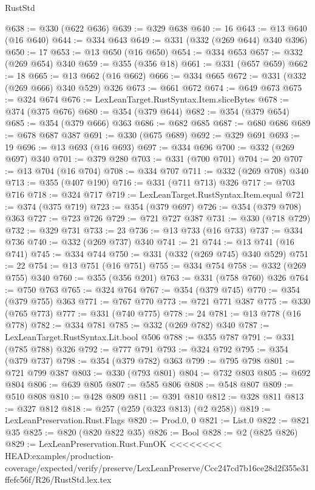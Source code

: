 \begin{lexlean}{RustStd}
\begin{coremodule}
{\begin{coremodule}
{{{{{@638 := @330 (@622 @636)
@639 := @329 @638
@640 := 16
@643 := @13 @640 (@16 @640)
@644 := @334 @643
@649 := @331 (@332 (@269 @644) @340 @396)
@650 := 17
@653 := @13 @650 (@16 @650)
@654 := @334 @653
@657 := @332 (@269 @654) @340
@659 := @355 (@356 @18)
@661 := @331 (@657 @659)
@662 := 18
@665 := @13 @662 (@16 @662)
@666 := @334 @665
@672 := @331 (@332 (@269 @666) @340 @529) @326
@673 := @661 @672
@674 := @649 @673
@675 := @324 @674
@676 := LexLeanTarget.RustSyntax.Item.sliceBytes
@678 := @374 (@375 @676)
@680 := @354 (@379 @644)
@682 := @354 (@379 @654)
@685 := @354 (@379 @666) @363
@686 := @682 @685
@687 := @680 @686
@689 := @678 @687 @387
@691 := @330 (@675 @689)
@692 := @329 @691
@693 := 19
@696 := @13 @693 (@16 @693)
@697 := @334 @696
@700 := @332 (@269 @697) @340
@701 := @379 @280
@703 := @331 (@700 @701)
@704 := 20
@707 := @13 @704 (@16 @704)
@708 := @334 @707
@711 := @332 (@269 @708) @340
@713 := @355 (@407 @190)
@716 := @331 (@711 @713) @326
@717 := @703 @716
@718 := @324 @717
@719 := LexLeanTarget.RustSyntax.Item.equal
@721 := @374 (@375 @719)
@723 := @354 (@379 @697)
@726 := @354 (@379 @708) @363
@727 := @723 @726
@729 := @721 @727 @387
@731 := @330 (@718 @729)
@732 := @329 @731
@733 := 23
@736 := @13 @733 (@16 @733)
@737 := @334 @736
@740 := @332 (@269 @737) @340
@741 := 21
@744 := @13 @741 (@16 @741)
@745 := @334 @744
@750 := @331 (@332 (@269 @745) @340 @529)
@751 := 22
@754 := @13 @751 (@16 @751)
@755 := @334 @754
@758 := @332 (@269 @755) @340
@760 := @355 (@356 @201)
@763 := @331 (@758 @760) @326
@764 := @750 @763
@765 := @324 @764
@767 := @354 (@379 @745)
@770 := @354 (@379 @755) @363
@771 := @767 @770
@773 := @721 @771 @387
@775 := @330 (@765 @773)
@777 := @331 (@740 @775)
@778 := 24
@781 := @13 @778 (@16 @778)
@782 := @334 @781
@785 := @332 (@269 @782) @340
@787 := LexLeanTarget.RustSyntax.Lit.bool @506
@788 := @355 @787
@791 := @331 (@785 @788) @326
@792 := @777 @791
@793 := @324 @792
@795 := @354 (@379 @737)
@798 := @354 (@379 @782) @363
@799 := @795 @798
@801 := @721 @799 @387
@803 := @330 (@793 @801)
@804 := @732 @803
@805 := @692 @804
@806 := @639 @805
@807 := @585 @806
@808 := @548 @807
@809 := @510 @808
@810 := @428 @809
@811 := @391 @810
@812 := @328 @811
@813 := @327 @812
@818 := @257 (@259 (@323 @813) (@2 @258))
@819 := LexLeanPreservation.Rust.Flags
@820 := Prod.{0, 0}
@821 := List.{0}
@822 := @821 @35
@825 := @820 (@820 @822 @35)
@826 := Bool
@828 := @2 (@825 @826)
@829 := LexLeanPreservation.Rust.FunOK
<<<<<<<< HEAD:examples/production-coverage/expected/verify/preserve/LexLeanPreserve/Ccc247cd7b16ce28d2f355e31ffefc56f/R26/RustStd.lex.tex
}}}}}
\end{coremodule}}
\end{coremodule}
\end{lexlean}
